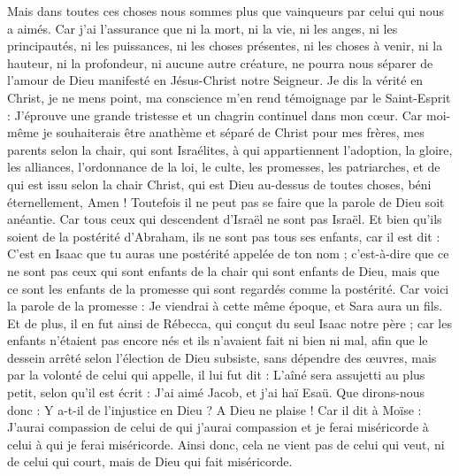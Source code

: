 \begin{multicols}{2}
Mais dans toutes ces choses nous sommes plus que vainqueurs par celui qui nous a aimés.
Car j’ai l’assurance que ni la mort, ni la vie, ni les anges, ni les principautés, ni les puissances, ni les choses présentes, ni les choses à venir,
ni la hauteur, ni la profondeur, ni aucune autre créature, ne pourra nous séparer de l'amour de Dieu manifesté en Jésus-Christ notre Seigneur.
\VerseOne{}Je dis la vérité en Christ, je ne mens point, ma conscience m’en rend témoignage par le Saint-Esprit :
J’éprouve une grande tristesse et un chagrin continuel dans mon cœur.
Car moi-même je souhaiterais être anathème et séparé de Christ pour mes frères, mes parents selon la chair,
qui sont Israélites, à qui appartiennent l'adoption, la gloire, les alliances, l'ordonnance de la loi, le culte,
les promesses, les patriarches, et de qui est issu selon la chair Christ, qui est Dieu au-dessus de toutes choses, béni éternellement, Amen !
Toutefois il ne peut pas se faire que la parole de Dieu soit anéantie. Car tous ceux qui descendent d’Israël ne sont pas Israël.
Et bien qu’ils soient de la postérité d'Abraham, ils ne sont pas tous ses enfants, car il est dit : C'est en Isaac que tu auras une postérité appelée de ton nom ;
c'est-à-dire que ce ne sont pas ceux qui sont enfants de la chair qui sont enfants de Dieu, mais que ce sont les enfants de la promesse qui sont regardés comme la postérité.
Car voici la parole de la promesse : Je viendrai à cette même époque, et Sara aura un fils.
Et de plus, il en fut ainsi de Rébecca, qui conçut du seul Isaac notre père ;
car les enfants n’étaient pas encore nés et ils n’avaient fait ni bien ni mal, afin que le dessein arrêté selon l'élection de Dieu subsiste, sans dépendre des œuvres, mais par la volonté de celui qui appelle,
il lui fut dit : L’aîné sera assujetti au plus petit, selon qu’il est écrit :
J'ai aimé Jacob, et j'ai haï Esaü.
Que dirons-nous donc : Y a-t-il de l’injustice en Dieu ? A Dieu ne plaise !
Car il dit à Moïse : J'aurai compassion de celui de qui j’aurai compassion et je ferai miséricorde à celui à qui je ferai miséricorde.
Ainsi donc, cela ne vient pas de celui qui veut, ni de celui qui court, mais de Dieu qui fait miséricorde.

\end{multicols}
